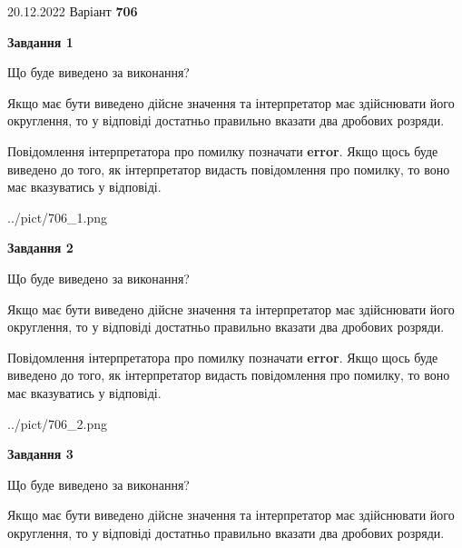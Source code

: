 \documentclass[12pt, ukrainian]{article}
\begin{document}
{20.12.2022 Варіант \No \textbf { 706 }\par}
{
\begin {Large}

{\begin {center}\textbf{Завдання 1}\end {center}}\par
Що буде виведено за виконання? \par

Якщо має бути виведено дійсне значення та інтерпретатор має здійснювати його округлення, 
то у відповіді достатньо правильно вказати два дробових розряди.

Повідомлення інтерпретатора про помилку позначати \textbf{error}.
Якщо щось буде виведено до того, як інтерпретатор видасть повідомлення про помилку, 
то воно має вказуватись у відповіді. \par

\begin{center}
	{../pict/706_1.png}
\end{center}
\newpage

{\begin {center}\textbf{Завдання 2}\end {center}}\par
Що буде виведено за виконання? \par

Якщо має бути виведено дійсне значення та інтерпретатор має здійснювати його округлення, 
то у відповіді достатньо правильно вказати два дробових розряди.

Повідомлення інтерпретатора про помилку позначати \textbf{error}.
Якщо щось буде виведено до того, як інтерпретатор видасть повідомлення про помилку, 
то воно має вказуватись у відповіді. \par

\begin{center}
	{../pict/706_2.png}
\end{center}
\newpage

{\begin {center}\textbf{Завдання 3}\end {center}}\par
Що буде виведено за виконання? \par

Якщо має бути виведено дійсне значення та інтерпретатор має здійснювати його округлення, 
то у відповіді достатньо правильно вказати два дробових розряди.


\end{Large}}
\end{document}
